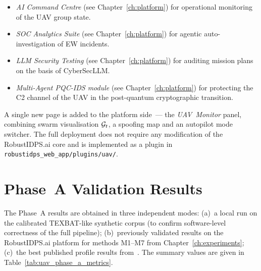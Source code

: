 \begin{itemize}\setlength\itemsep{0.1em}
\item \emph{AI Command Centre} (see Chapter~\ref{ch:platform}) for
operational monitoring of the UAV group state.
\item \emph{SOC Analytics Suite} (see Chapter~\ref{ch:platform}) for
agentic auto-investigation of EW incidents.
\item \emph{LLM Security Testing} (see Chapter~\ref{ch:platform}) for
auditing mission plans on the basis of \textsf{CyberSecLLM}.
\item \emph{Multi-Agent PQC-IDS module} (see Chapter~\ref{ch:platform})
for protecting the C2 channel of the UAV in the post-quantum
cryptographic transition.
\end{itemize}

A single new page is added to the platform side~--- the
\emph{UAV~Monitor} panel, combining swarm visualisation $\mathcal{G}_t$, a
spoofing map and an autopilot mode switcher. The full deployment
does not require any modification of the \textsf{RobustIDPS.ai} core
and is implemented as a plugin in
\texttt{robustidps\_web\_app/plugins/uav/}.


\section{Phase~A Validation Results}
\label{sec:uav_phase_a_results}

The Phase~A results are obtained in three independent modes:
(a)~a local run on the calibrated TEXBAT-like synthetic corpus (to
confirm software-level correctness of the full pipeline);
(b)~previously validated results on the \textsf{RobustIDPS.ai}
platform for methods \textsf{M1}--\textsf{M7} from
Chapter~\ref{ch:experiments}; (c)~the best published profile results
from~\cite{aigner_2025_uav,borhani_2024_uav,cmbrf_vit_2026_uav}. The
summary values are given in Table~\ref{tab:uav_phase_a_metrics}.

